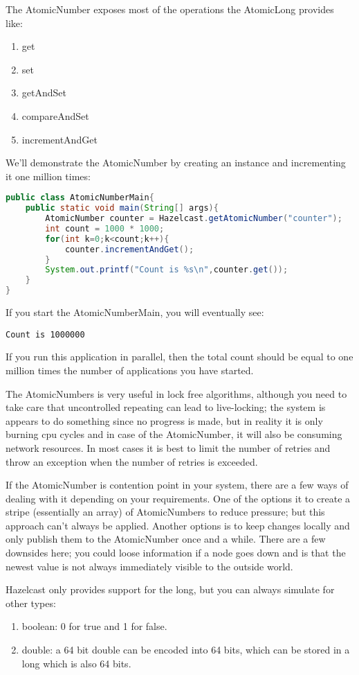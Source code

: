 The AtomicNumber exposes most of the operations the AtomicLong provides like:
\begin{enumerate}
\item get
\item set
\item getAndSet
\item compareAndSet
\item incrementAndGet
\end{enumerate}

We'll demonstrate the AtomicNumber by creating an instance and incrementing it one million times:
\begin{lstlisting}[language=java]
public class AtomicNumberMain{
    public static void main(String[] args){
        AtomicNumber counter = Hazelcast.getAtomicNumber("counter");
        int count = 1000 * 1000;
        for(int k=0;k<count;k++){
            counter.incrementAndGet();
        }
        System.out.printf("Count is %s\n",counter.get());
    }
}
\end{lstlisting}
If you start the AtomicNumberMain, you will eventually see:
\begin{verbatim}
Count is 1000000
\end{verbatim}

If you run this application in parallel, then the total count should be equal to one million times the number of applications you have started.

The AtomicNumbers is very useful in lock free algorithms, although you need to take care that uncontrolled repeating can lead to live-locking; the system is appears to do something since no progress is made, but in reality it is only burning cpu cycles and in case of the AtomicNumber, it will also be consuming network resources. In most cases it is best to limit the number of retries and throw an exception when the number of retries is exceeded.

If the AtomicNumber is contention point in your system, there are a few ways of dealing with it depending on your requirements. One of the options it to create a stripe (essentially an array) of AtomicNumbers to reduce pressure; but this approach can't always be applied. Another options is to keep changes locally and only publish them to the AtomicNumber once and a while. There are a few downsides here; you could loose information if a node goes down and is that the newest value is not always immediately visible to the outside world. 

Hazelcast only provides support for the long, but you can always simulate for other types:
\begin{enumerate}
\item boolean: 0 for true and 1 for false.
\item double: a 64 bit double can be encoded into 64 bits, which can be stored in a long 
      which is also 64 bits.
\end{enumerate}

